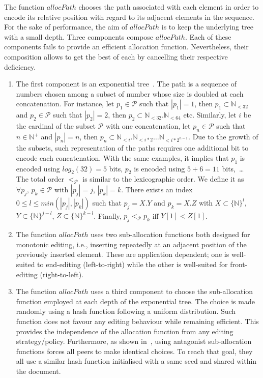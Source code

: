 \begin{asparadesc}
  The function $allocPath$ chooses the path associated with each element in
  order to encode its relative position with regard to its adjacent elements in
  the sequence. For the sake of performance, the aim of $allocPath$ is to keep
  the underlying tree with a small depth. Three components compose
  $allocPath$. Each of these components fails to provide an efficient allocation
  function. Nevertheless, their composition allows to get the best of each by
  cancelling their respective deficiency.
  \begin{enumerate}[leftmargin=*]
  \item The first component is an exponential
    tree~\cite{andersson1996faster,andersson2007dynamic}. The path is a sequence
    of numbers chosen among a subset of number whose size is doubled at each
    concatenation. For instance, let $p_1\in\mathcal{P}$ such that $|p_1|=1$,
    then $p_1\subset \mathbb{N}_{<32}$ and $p_2\in\mathcal{P}$ such that
    $|p_2|=2$, then $p_2\subset \mathbb{N}_{<32}.\mathbb{N}_{<64}$
    etc. Similarly, let $i$ be the cardinal of the subset $\mathcal{P}$ with one
    concatenation, let $p_n\in\mathcal{P}$ such that $n\in\mathbb{N}^+$ and
    $|p_n|=n$, then
    $p_n\subset \mathbb{N}_{<i}.\mathbb{N}_{<i*2}\ldots\mathbb{N}_{<i*2^{n-1}}$.
    Due to the growth of the subsets, such representation of the paths requires
    one additional bit to encode each concatenation. With the same examples, it
    implies that $p_1$ is encoded using $log_2(32)=5$ bits, $p_2$ is encoded
    using $5+6=11$ bits,~\ldots \\ The total order $<_{\mathcal{P}}$ is similar
    to the lexicographic order. We define it as
    $\forall p_j,\,p_k\in\mathcal{P}$ with $|p_j|=j$, $|p_k|=k$. There exists an
    index $0\leq l\leq min(|p_j|,|p_k|)$ such that $p_j = X.Y$ and $p_k = X.Z$
    with $X\subset \{\mathbb{N}\}^l$, $Y \subset \{\mathbb{N}\}^{j-l}$,
    $Z \subset \{\mathbb{N}\}^{k-l}$. Finally, $p_j<_{\mathcal{P}}p_k$ iff
    $Y[1]<Z[1]$.
  \item The function $allocPath$ uses two sub-allocation functions both designed
    for monotonic editing, i.e., inserting repeatedly at an adjacent position of
    the previously inserted element. These are application dependent; one is
    well-suited to end-editing (left-to-right) while the other is well-suited
    for front-editing (right-to-left).
  \item The function $allocPath$ uses a third component to choose the
    sub-allocation function employed at each depth of the exponential tree. The
    choice is made randomly using a hash function following a uniform
    distribution. Such function does not favour any editing behaviour while
    remaining efficient. This provides the independence of the allocation
    function from any editing strategy/policy. Furthermore, as shown
    in~\cite{nedelec2013concurrency}, using antagonist sub-allocation functions
    forces all peers to make identical choices. To reach that goal, they all use
    a similar hash function initialised with a same seed and shared within the
    document.
  \end{enumerate}


\end{asparadesc}
